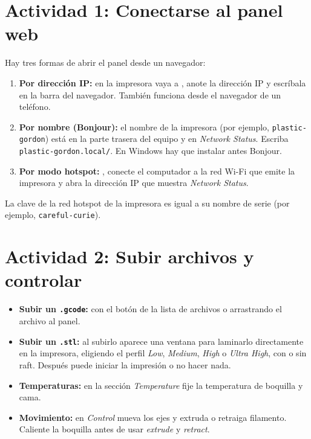 \newpage
\section{Actividad 1: Conectarse al panel web}

Hay tres formas de abrir el panel desde un navegador:

\begin{enumerate}
    \item \textbf{Por dirección IP:} en la impresora vaya a \flecha{}\flecha{}, anote la dirección IP y escríbala en la barra del navegador. También funciona desde el navegador de un teléfono.
    \item \textbf{Por nombre (Bonjour):} el nombre de la impresora (por ejemplo, \texttt{plastic-gordon}) está en la parte trasera del equipo y en \emph{Network Status}. Escriba \texttt{plastic-gordon.local/}. En Windows hay que instalar antes Bonjour.
    \item \textbf{Por modo hotspot:} \flecha{}\flecha{}, conecte el computador a la red Wi-Fi que emite la impresora y abra la dirección IP que muestra \emph{Network Status}.
\end{enumerate}

\begin{infobox}
La clave de la red hotspot de la impresora es igual a su nombre de serie (por ejemplo, \texttt{careful-curie}).
\end{infobox}

\section{Actividad 2: Subir archivos y controlar}

\begin{itemize}
    \item \textbf{Subir un \texttt{.gcode}:} con el botón  de la lista de archivos o arrastrando el archivo al panel.
    \item \textbf{Subir un \texttt{.stl}:} al subirlo aparece una ventana para laminarlo directamente en la impresora, eligiendo el perfil \emph{Low}, \emph{Medium}, \emph{High} o \emph{Ultra High}, con o sin raft. Después puede iniciar la impresión o no hacer nada.
    \item \textbf{Temperaturas:} en la sección \emph{Temperature} fije la temperatura de boquilla y cama.
    \item \textbf{Movimiento:} en \emph{Control} mueva los ejes y extruda o retraiga filamento. Caliente la boquilla antes de usar \emph{extrude} y \emph{retract}.
\end{itemize}

